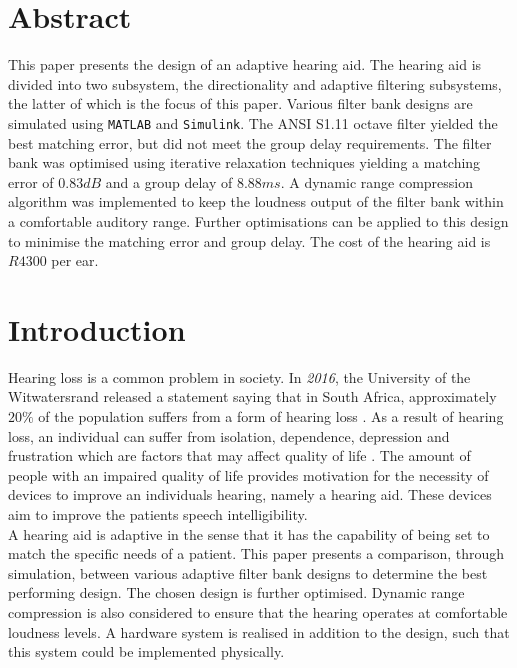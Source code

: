\documentclass[11pt,onecolumn]{witseiepaper}
\begin{document}
\tableofcontents
\newpage

\section*{Abstract}

\noindent This paper presents the design of an adaptive hearing aid. The hearing aid is divided into two subsystem, the directionality and adaptive filtering subsystems, the latter of which is the focus of this paper. Various filter bank designs are simulated using \texttt{MATLAB} and \texttt{Simulink}. The ANSI S1.11 octave filter yielded the best matching error, but did not meet the group delay requirements. The filter bank was optimised using iterative relaxation techniques yielding a matching error of $0.83dB$ and a group delay of $8.88ms$. A dynamic range compression algorithm was implemented to keep the loudness output of the filter bank within a comfortable auditory range. Further optimisations can be applied to this design to minimise the matching error and group delay. The cost of the hearing aid is $R4300$ per ear.

\section{Introduction}

\noindent Hearing loss is a common problem in society. In \textit{2016}, the University of the Witwatersrand released a statement saying that in South Africa, approximately $20\%$ of the population suffers from a form of hearing loss \cite{witsHearingStats}. As a result of hearing loss, an individual can suffer from isolation, dependence, depression and frustration which are factors that may affect quality of life \cite{qualityOfLife}. The amount of people with an impaired quality of life provides motivation for the necessity of devices to improve an individuals hearing, namely a hearing aid. These devices aim to improve the patients speech intelligibility. \\
\newline
\noindent A hearing aid is adaptive in the sense that it has the capability of being set to match the specific needs of a patient. This paper presents a comparison, through simulation, between various adaptive filter bank designs to determine the best performing design. The chosen design is further optimised. Dynamic range compression is also considered to ensure that the hearing operates at comfortable loudness levels. A hardware system is realised in addition to the design, such that this system could be implemented physically.
\end{document}

